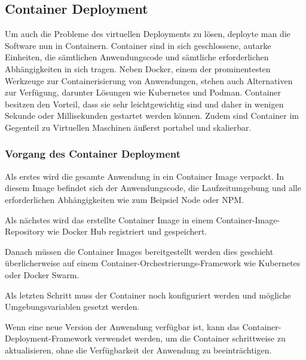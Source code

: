 \cite{Virtuelles_Deployment}

\subsection{Container Deployment}
Um auch die Probleme des virtuellen Deployments zu lösen, deployte man die Software nun in Containern.
Container sind in sich geschlossene, autarke Einheiten, die sämtlichen Anwendungscode und sämtliche erforderlichen Abhängigkeiten in sich tragen. Neben Docker, einem der prominentesten Werkzeuge zur Containerisierung von Anwendungen, stehen auch Alternativen zur Verfügung, darunter Lösungen wie Kubernetes und Podman. Container besitzen den Vorteil, dass sie sehr leichtgewichtig sind und daher in wenigen Sekunde oder Millisekunden gestartet werden können. Zudem sind Container im Gegenteil zu Virtuellen Maschinen äußerst portabel und skalierbar.



\subsubsection{Vorgang des Container Deployment}

Als erstes wird die gesamte Anwendung in ein Container Image verpackt. In diesem Image befindet sich der Anwendungscode, die Laufzeitumgebung und alle erforderlichen Abhängigkeiten wie zum Beipsiel Node oder NPM.

Als nächstes wird das erstellte Container Image in einem Container-Image-Repository wie Docker Hub registriert und gespeichert.

Danach müssen die Container Images bereitgestellt werden dies geschieht überlicherweise auf einem Container-Orchestrierungs-Framework wie Kubernetes oder Docker Swarm.

Als letzten Schritt muss der Container noch konfiguriert werden und mögliche Umgebungsvariablen gesetzt werden.

Wenn eine neue Version der Anwendung verfügbar ist, kann das Container-Deployment-Framework verwendet werden, um die Container schrittweise zu aktualisieren, ohne die Verfügbarkeit der Anwendung zu beeinträchtigen.


